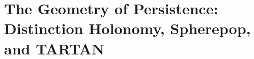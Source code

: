 \documentclass[11pt,twoside]{book}
\begin{document}
\frontmatter
\tableofcontents

\mainmatter
\part{The Geometry of Persistence: Distinction Holonomy, Spherepop, and TARTAN}






\backmatter
\appendix


\end{document}
